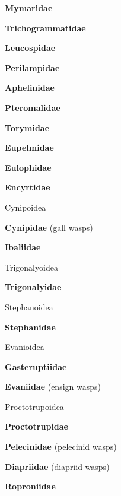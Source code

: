 \documentclass[letterpaper,10pt]{article}
\begin{document}
{\makebox[0.6cm]{}  \textbf{Mymaridae} \par
\makebox[0.6cm]{}  \textbf{Trichogrammatidae} \par
\makebox[0.6cm]{}  \textbf{Leucospidae} \par
\makebox[0.6cm]{}  \textbf{Perilampidae} \par
\makebox[0.6cm]{}  \textbf{Aphelinidae} \par
\makebox[0.6cm]{}  \textbf{Pteromalidae} \par
\makebox[0.6cm]{}  \textbf{Torymidae} \par
\makebox[0.6cm]{}  \textbf{Eupelmidae} \par
\makebox[0.6cm]{}  \textbf{Eulophidae} \par
\makebox[0.6cm]{}  \textbf{Encyrtidae} \par		
\makebox[0.4cm]{}  Cynipoidea \par
\makebox[0.6cm]{}  \textbf{Cynipidae} (gall wasps) \par
\makebox[0.6cm]{}  \textbf{Ibaliidae} \par
\makebox[0.4cm]{}  Trigonalyoidea \par
\makebox[0.6cm]{}  \textbf{Trigonalyidae} \par
\makebox[0.4cm]{}  Stephanoidea \par
\makebox[0.6cm]{}  \textbf{Stephanidae} \par
\makebox[0.4cm]{}  Evanioidea \par
\makebox[0.6cm]{}  \textbf{Gasteruptiidae} \par
\makebox[0.6cm]{}  \textbf{Evaniidae} (ensign wasps) \par
\makebox[0.4cm]{}  Proctotrupoidea \par
\makebox[0.6cm]{}  \textbf{Proctotrupidae} \par
\makebox[0.6cm]{}  \textbf{Pelecinidae} (pelecinid wasps) \par
\makebox[0.6cm]{}  \textbf{Diapriidae} (diapriid wasps) \par
\makebox[0.6cm]{}  \textbf{Roproniidae} \par
}
\end{document}
